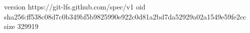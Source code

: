 version https://git-lfs.github.com/spec/v1
oid sha256:ff538c08d7c0b349bf5b9825990e922c0d81a2bd7da52929a02a1549e59fe2cc
size 329919
